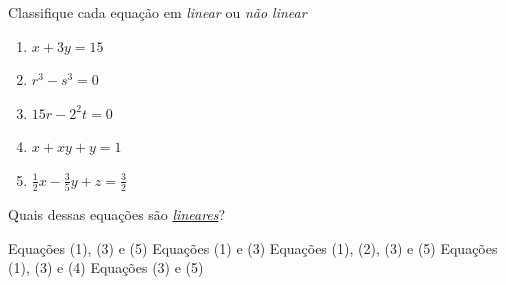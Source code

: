 Classifique cada equação em {\it linear} ou {\it não linear}
\begin{enumerate}[(1)]
\item $x+3y=15$
\item $r^3-s^3=0$
\item $15r-2^2t=0$
\item $x+xy+y=1$
\item $\frac{1}{2}x-\frac{3}{5}y+z=\frac{3}{2}$
\end{enumerate}
Quais dessas equações são \underline{\it lineares}?

Equações (1), (3) e (5)
Equações (1) e (3)
Equações (1), (2), (3) e (5)
Equações (1), (3) e (4)
Equações (3) e (5)


